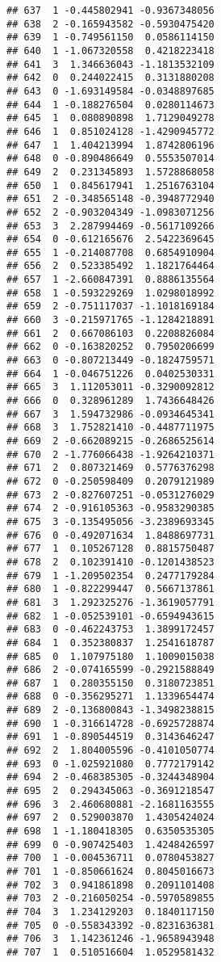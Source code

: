 \documentclass[
]{article}
\begin{document}
\begin{verbatim}
## 637  1 -0.445802941 -0.9367348056
## 638  2 -0.165943582 -0.5930475420
## 639  1 -0.749561150  0.0586114150
## 640  1 -1.067320558  0.4218223418
## 641  3  1.346636043 -1.1813532109
## 642  0  0.244022415  0.3131880208
## 643  0 -1.693149584 -0.0348897685
## 644  1 -0.188276504  0.0280114673
## 645  1  0.080890898  1.7129049278
## 646  1  0.851024128 -1.4290945772
## 647  1  1.404213994  1.8742806196
## 648  0 -0.890486649  0.5553507014
## 649  2  0.231345893  1.5728868058
## 650  1  0.845617941  1.2516763104
## 651  2 -0.348565148 -0.3948772940
## 652  2 -0.903204349 -1.0983071256
## 653  3  2.287994469 -0.5617109266
## 654  0 -0.612165676  2.5422369645
## 655  1 -0.214087708  0.6854910904
## 656  2  0.523385492  1.1821764464
## 657  1 -2.660847391  0.8886135564
## 658  1 -0.593229269  1.0298018992
## 659  2 -0.751117037 -1.1018169184
## 660  3 -0.215971765 -1.1284218891
## 661  2  0.667086103  0.2208826084
## 662  0 -0.163820252  0.7950206699
## 663  0 -0.807213449 -0.1824759571
## 664  1 -0.046751226  0.0402530331
## 665  3  1.112053011 -0.3290092812
## 666  0  0.328961289  1.7436648426
## 667  3  1.594732986 -0.0934645341
## 668  3  1.752821410 -0.4487711975
## 669  2 -0.662089215 -0.2686525614
## 670  2 -1.776066438 -1.9264210371
## 671  2  0.807321469  0.5776376298
## 672  0 -0.250598409  0.2079121989
## 673  2 -0.827607251 -0.0531276029
## 674  2 -0.916105363 -0.9583290385
## 675  3 -0.135495056 -3.2389693345
## 676  0 -0.492071634  1.8488697731
## 677  1  0.105267128  0.8815750487
## 678  2  0.102391410 -0.1201438523
## 679  1 -1.209502354  0.2477179284
## 680  1 -0.822299447  0.5667137861
## 681  3  1.292325276 -1.3619057791
## 682  1 -0.052539101 -0.6594943615
## 683  0 -0.462243753  1.3899172457
## 684  1  0.352380837  1.2541618787
## 685  0  1.107975180  1.1009015038
## 686  2 -0.074165599 -0.2921588849
## 687  1  0.280355150  0.3180723851
## 688  0 -0.356295271  1.1339654474
## 689  2 -0.136800843 -1.3498238815
## 690  1 -0.316614728 -0.6925728874
## 691  1 -0.890544519  0.3143646247
## 692  2  1.804005596 -0.4101050774
## 693  0 -1.025921080  0.7772179142
## 694  2 -0.468385305 -0.3244348904
## 695  2  0.294345063 -0.3691218547
## 696  3  2.460680881 -2.1681163555
## 697  2  0.529003870  1.4305424024
## 698  1 -1.180418305  0.6350535305
## 699  0 -0.907425403  1.4248426597
## 700  1 -0.004536711  0.0780453827
## 701  1 -0.850661624  0.8045016673
## 702  3  0.941861898  0.2091101408
## 703  2 -0.216050254 -0.5970589855
## 704  3  1.234129203  0.1840117150
## 705  0 -0.558343392 -0.8231636381
## 706  3  1.142361246 -1.9658943948
## 707  1  0.510516604  1.0529581432

\end{verbatim}
\end{document}
